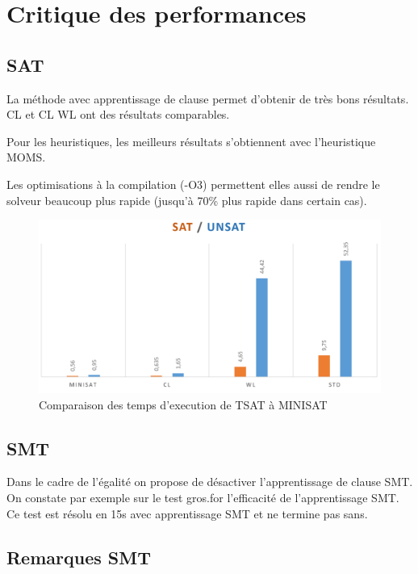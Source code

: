 \documentclass{article}
\begin{document}
\section{Critique des performances}
\subsection{SAT}
La méthode avec apprentissage de clause permet d'obtenir de très bons résultats. CL et CL WL ont des résultats comparables.

Pour les heuristiques, les meilleurs résultats s'obtiennent avec l'heuristique MOMS.

Les optimisations à la compilation (-O3) permettent elles aussi de rendre le solveur beaucoup plus rapide (jusqu'à 70\% plus rapide dans certain cas).
\\
\begin{figure}[h]
    \begin{center}
        \includegraphics[scale=0.25]{time.png}
    \end{center}
    \caption{Comparaison des temps d'execution de TSAT à MINISAT}
    \label{Comparaisons}
\end{figure}

\subsection{SMT}
Dans le cadre de l'égalité on propose de désactiver l'apprentissage de clause SMT. On constate par exemple sur le test gros.for l'efficacité de l'apprentissage SMT. Ce test est résolu en 15s avec apprentissage SMT et ne termine pas sans.

\subsection{Remarques SMT}
\end{document}
